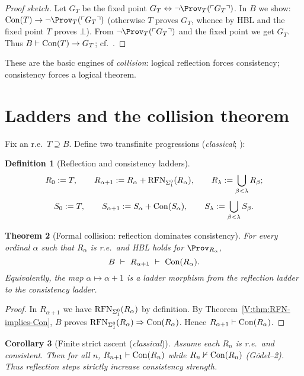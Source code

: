\documentclass[11pt]{article}
\newtheorem{theorem}{Theorem}[section]
\newtheorem{corollary}[theorem]{Corollary}
\theoremstyle{definition}
\newtheorem{definition}[theorem]{Definition}
\theoremstyle{remark}
\begin{document}
\begin{proof}[Proof sketch]
Let \(G_T\) be the fixed point \(G_T \leftrightarrow \neg \Prov_T(\ulcorner G_T\urcorner)\).
In \(B\) we show: \(\Con(T)\to \neg \Prov_T(\ulcorner G_T\urcorner)\) (otherwise \(T\) proves \(G_T\),
whence by HBL and the fixed point \(T\) proves \(\bot\)). From \(\neg \Prov_T(\ulcorner G_T\urcorner)\)
and the fixed point we get \(G_T\). Thus \(B\vdash \mathrm{Con}(T)\to G_T\); cf.\ \cite{HajekPudlak}.
\end{proof}

These are the basic engines of \emph{collision}: logical reflection forces consistency; consistency forces a logical theorem.

\section{Ladders and the collision theorem}

Fix an r.e.\ \(T\supseteq B\). Define two transfinite progressions (\emph{classical}; \cite{Turing1939,Feferman1962}):

\begin{definition}[Reflection and consistency ladders]\label{V:def:ladders}
\[
R_0:=T,\qquad R_{\alpha+1}:=R_\alpha+\mathrm{RFN}_{\Sigma^0_1}(R_\alpha),\qquad R_\lambda:=\bigcup_{\beta<\lambda}R_\beta;
\]
\[
S_0:=T,\qquad S_{\alpha+1}:=S_\alpha+\mathrm{Con}(S_\alpha),\qquad S_\lambda:=\bigcup_{\beta<\lambda}S_\beta.
\]
\end{definition}

\begin{theorem}[Formal collision: reflection dominates consistency]\label{V:thm:collision}
For every ordinal \(\alpha\) such that \(R_\alpha\) is r.e.\ and HBL holds for \(\Prov_{R_\alpha}\),
\[
B\ \vdash\ R_{\alpha+1}\ \vdash\ \Con(R_\alpha).
\]
Equivalently, the map \(\alpha\mapsto \alpha{+}1\) is a \emph{ladder morphism} from the reflection ladder to the consistency ladder.
\end{theorem}

\begin{proof}
In \(R_{\alpha+1}\) we have \(\mathrm{RFN}_{\Sigma^0_1}(R_\alpha)\) by definition. By Theorem~\ref{V:thm:RFN-implies-Con},
\(B\) proves \(\mathrm{RFN}_{\Sigma^0_1}(R_\alpha)\Rightarrow \mathrm{Con}(R_\alpha)\). Hence \(R_{\alpha+1}\vdash \mathrm{Con}(R_\alpha)\).
\end{proof}

\begin{corollary}[Finite strict ascent (\emph{classical})]\label{V:cor:finite-ascent}
Assume each \(R_n\) is r.e.\ and consistent. Then for all \(n\),
\(R_{n+1}\vdash \mathrm{Con}(R_n)\) while \(R_n\nvdash \mathrm{Con}(R_n)\) (G\"odel–2). Thus reflection steps strictly increase consistency strength.
\end{corollary}
\end{document}
